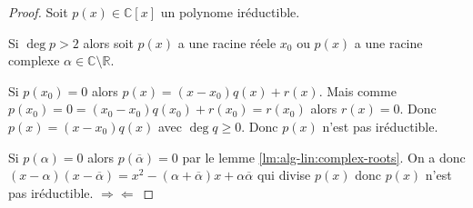 \begin{proof}
Soit $p(x)\in\mathbb{C}[x]$ un polynome iréductible.

Si $\deg p>2$ alors soit $p(x)$ a une racine réele $x_0$ ou $p(x)$ a une racine complexe $\alpha\in\mathbb{C}\setminus\mathbb{R}$.

Si $p(x_0)=0$ alors $p(x)=(x-x_0)q(x)+r(x)$. Mais comme $p(x_0)=0=(x_0-x_0)q(x_0)+r(x_0)=r(x_0)$ alors $r(x)=0$. Donc $p(x)=(x-x_0)q(x)$ avec $\deg q\geq0$. Donc $p(x)$ n'est pas iréductible.

Si $p(\alpha)=0$ alors $p(\overline{\alpha})=0$ par le lemme \ref{lm:alg-lin:complex-roots}. On a donc $(x-\alpha)(x-\overline{\alpha})=x^2-(\alpha+\overline{\alpha})x+\alpha\overline{\alpha}$ qui divise $p(x)$ donc $p(x)$ n'est pas iréductible. $\Longrightarrow\Longleftarrow$
\end{proof}
